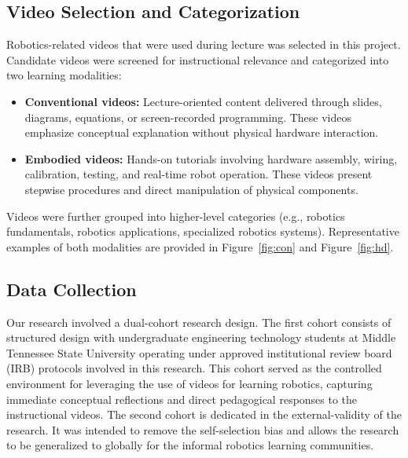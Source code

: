 \documentclass[fleqn,10pt]{JLA_article} %
\begin{document}
\subsection{Video Selection and Categorization}

Robotics-related videos that were used during lecture was selected in this project. Candidate videos were screened for instructional relevance and categorized into two learning modalities:

\begin{itemize}[noitemsep]
\item \textbf{Conventional videos:} Lecture-oriented content delivered through slides, diagrams, equations, or screen-recorded programming. These videos emphasize conceptual explanation without physical hardware interaction.
\item \textbf{Embodied videos:} Hands-on tutorials involving hardware assembly, wiring, calibration, testing, and real-time robot operation. These videos present stepwise procedures and direct manipulation of physical components.
\end{itemize}

Videos were further grouped into higher-level categories (e.g., robotics fundamentals, robotics applications, specialized robotics systems). Representative examples of both modalities are provided in Figure~\ref{fig:con} and Figure~\ref{fig:hd}.

\subsection{Data Collection}

Our research involved a dual-cohort research design. The first cohort consists of structured design with undergraduate engineering technology students at Middle Tennessee State University operating under approved institutional review board (IRB) protocols involved in this research. This cohort served as the controlled environment for leveraging the use of videos for learning robotics, capturing immediate conceptual reflections and direct pedagogical responses to the instructional videos. The second cohort is dedicated in the external-validity of the research. It was intended to remove the self-selection bias and allows the research to be generalized to globally for the informal robotics learning communities.
\end{document}

